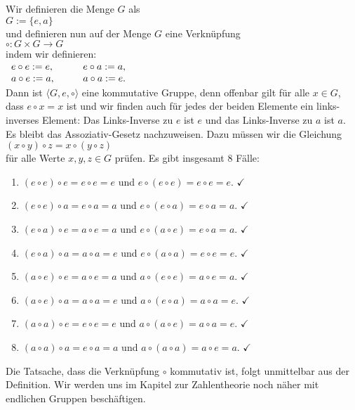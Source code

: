 \begin{enumerate}
      Wir definieren die Menge $G$ als
      \\[0.2cm]
      \hspace*{1.3cm}
      $G := \{ e, a \}$
      \\[0.2cm]
      und definieren nun auf der Menge $G$ eine Verkn\"{u}pfung
      \\[0.2cm]
      \hspace*{1.3cm}
      $\circ: G \times G \rightarrow G$
      \\[0.2cm]
      indem wir definieren:
      \\[0.2cm]
      \hspace*{1.3cm}
      $
      \begin{array}[t]{lcl}
        e \circ e := e, & \quad & e \circ a := a, \\
        a \circ e := a, & \quad & a \circ a := e. 
      \end{array}
      $
      \\[0.2cm]
      Dann ist $\langle G, e, \circ \rangle$ eine kommutative Gruppe, denn offenbar gilt f\"{u}r alle $x \in G$, dass 
      $e \circ x = x$ ist und wir finden auch f\"{u}r jedes der beiden Elemente ein links-inverses Element:
      Das Links-Inverse zu $e$ ist $e$ und das Links-Inverse zu $a$ ist $a$.  Es bleibt das
      Assoziativ-Gesetz nachzuweisen.  Dazu m\"{u}ssen wir die Gleichung
      \\[0.2cm]
      \hspace*{1.3cm}
      $(x \circ y) \circ z = x \circ (y \circ z)$
      \\[0.2cm]
      f\"{u}r alle Werte $x,y,z \in G$ pr\"{u}fen.  Es gibt insgesamt 8 F\"{a}lle:
      \begin{enumerate}
      \item $(e \circ e) \circ e = e \circ e = e$ und $e \circ (e \circ e) = e \circ e = e$. $\checkmark$
      \item $(e \circ e) \circ a = e \circ a = a$ und $e \circ (e \circ a) = e \circ a = a$. $\checkmark$
      \item $(e \circ a) \circ e = a \circ e = a$ und $e \circ (a \circ e) = e \circ a = a$. $\checkmark$
      \item $(e \circ a) \circ a = a \circ a = e$ und $e \circ (a \circ a) = e \circ e = e$. $\checkmark$
      \item $(a \circ e) \circ e = a \circ e = a$ und $a \circ (e \circ e) = a \circ e = a$. $\checkmark$
      \item $(a \circ e) \circ a = a \circ a = e$ und $a \circ (e \circ a) = a \circ a = e$. $\checkmark$
      \item $(a \circ a) \circ e = e \circ e = e$ und $a \circ (a \circ e) = a \circ a = e$. $\checkmark$
      \item $(a \circ a) \circ a = e \circ a = a$ und $a \circ (a \circ a) = a \circ e = a$. $\checkmark$
      \end{enumerate}
      Die Tatsache, dass die Verkn\"{u}pfung $\circ$ kommutativ ist, folgt unmittelbar aus der Definition.
      Wir werden uns im Kapitel zur Zahlentheorie noch n\"{a}her mit endlichen Gruppen besch\"{a}ftigen.
      \eoxs
\end{enumerate}

